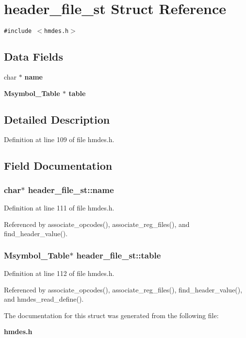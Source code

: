 \section{header\_\-file\_\-st Struct Reference}
\label{structheader__file__st}
{\tt \#include $<$hmdes.h$>$}

\subsection*{Data Fields}
\begin{CompactItemize}
\item 
char $\ast$ \bf{name}
\item 
\bf{Msymbol\_\-Table} $\ast$ \bf{table}
\end{CompactItemize}


\subsection{Detailed Description}




Definition at line 109 of file hmdes.h.

\subsection{Field Documentation}
\subsubsection{\setlength{\rightskip}{0pt plus 5cm}char$\ast$ \bf{header\_\-file\_\-st::name}}\label{structheader__file__st_43c9f12480c2926b494091a52ae46a59}




Definition at line 111 of file hmdes.h.

Referenced by associate\_\-opcodes(), associate\_\-reg\_\-files(), and find\_\-header\_\-value().
\subsubsection{\setlength{\rightskip}{0pt plus 5cm}\bf{Msymbol\_\-Table}$\ast$ \bf{header\_\-file\_\-st::table}}\label{structheader__file__st_93c9ca0bd08242336760105f976f93e4}




Definition at line 112 of file hmdes.h.

Referenced by associate\_\-opcodes(), associate\_\-reg\_\-files(), find\_\-header\_\-value(), and hmdes\_\-read\_\-define().

The documentation for this struct was generated from the following file:\begin{CompactItemize}
\item 
\bf{hmdes.h}\end{CompactItemize}
